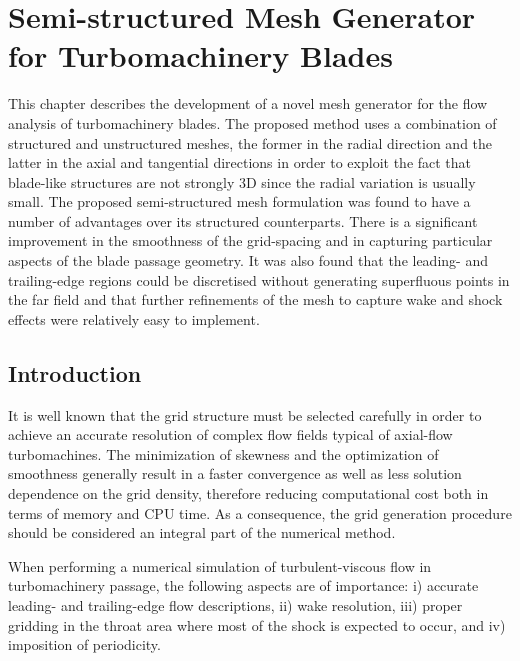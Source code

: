 %
%
%
%
%
\chapter{Semi-structured Mesh Generator for Turbomachinery Blades}
 \label{mesh.chap}
\setcounter{footnote}{0}
%
\newcommand{\fdx}[1]{\frac{\partial }{\partial {#1} }}
\newcommand{\fpa}[3]{\frac{\partial {\mathbf{#1}}_{#2} }{\partial {#3} }}
\newcommand{\spd}[2]{\frac{\partial^2 {#1} }{\partial {#2}^2 }}
\newcommand{\sxd}[3]{\frac{\partial^2 {#1} }{\partial {#2} \partial {#3} }}
%
%
 This chapter describes the development of a novel
 mesh generator for the flow analysis of turbomachinery blades. The
 proposed method uses a combination of structured and unstructured meshes,
 the former in the
 radial direction and the latter in the axial and tangential
 directions in order to exploit the fact that blade-like structures
 are not strongly 3D since the radial variation
 is usually small. The proposed semi-structured mesh formulation was found to
 have a number of advantages over its structured counterparts.
 There is a significant improvement
 in the smoothness of the grid-spacing and in capturing
 particular aspects of the blade passage geometry. It was also found that
 the leading- and trailing-edge regions could be  discretised without generating
 superfluous points in the far field and that further refinements of the mesh
 to capture wake and shock effects were relatively easy to implement.
%
%
%
%
\section{Introduction}
%
 It is well known that the grid structure must be selected carefully
 in order to achieve an accurate resolution of complex flow fields
 typical of axial-flow turbomachines.
 The minimization of skewness and the optimization of smoothness
 generally result in a faster convergence as well as less solution dependence
 on the grid density, therefore reducing
 computational cost both in terms of memory and CPU time.
 As a consequence, the grid generation procedure should be considered
 an integral part of the numerical method.

 When performing a numerical simulation of turbulent-viscous flow in turbomachinery
 passage, the following aspects are of importance: i)
 accurate leading- and trailing-edge flow descriptions, ii) wake resolution,
 iii) proper gridding in the throat area where most of the shock
 is expected to occur, and iv) imposition of periodicity.

